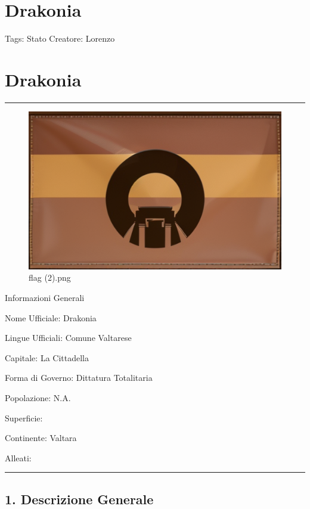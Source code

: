 \section{Drakonia}\label{drakonia}

Tags: Stato Creatore: Lorenzo

\section{Drakonia}\label{drakonia-1}

\begin{center}\rule{0.5\linewidth}{0.5pt}\end{center}

\begin{figure}
\centering
\includegraphics{flag_(2).png}
\caption{flag (2).png}
\end{figure}

Informazioni Generali

Nome Ufficiale: Drakonia

Lingue Ufficiali: Comune Valtarese

Capitale: La Cittadella

Forma di Governo: Dittatura Totalitaria

Popolazione: N.A.

Superficie:

Continente: Valtara

Alleati:

\begin{center}\rule{0.5\linewidth}{0.5pt}\end{center}

\subsection{1. Descrizione Generale}\label{descrizione-generale}

